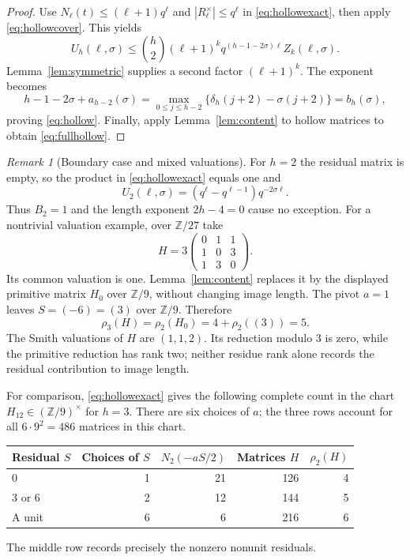 \documentclass[11pt]{article}
\numberwithin{equation}{section}
\theoremstyle{remark}
\newtheorem{remark}[theorem]{Remark}
\newcommand{\Z}{\mathbb Z}
\begin{document}
\begin{proof}
Use $N_\ell(t)\le(\ell+1)q^\ell$ and
$|R_\ell^\times|\le q^\ell$ in \eqref{eq:hollowexact}, then apply
\eqref{eq:hollowcover}. This yields
\begin{equation}\label{eq:hollowpivotbound}
 U_h(\ell,\sigma )\le\binom h2(\ell+1)^k
              q^{(h-1-2\sigma )\ell}Z_k(\ell,\sigma ).
\end{equation}
Lemma~\ref{lem:symmetric} supplies a second factor $(\ell+1)^k$.
The exponent becomes
\[
 h-1-2\sigma +a_{h-2}(\sigma )
 =\max_{0\le j\le h-2}\{\delta_h(j+2)-\sigma (j+2)\}=b_h(\sigma ),
\]
proving \eqref{eq:hollow}. Finally, apply Lemma~\ref{lem:content}
to hollow matrices to obtain \eqref{eq:fullhollow}.
\end{proof}

\begin{remark}[Boundary case and mixed valuations]\label{rem:mixedvaluation}
For $h=2$ the residual matrix is empty, so the product in
\eqref{eq:hollowexact} equals one and
\[
 U_2(\ell,\sigma )=(q^\ell-q^{\ell-1})q^{-2\sigma \ell}.
\]
Thus $B_2=1$ and the length exponent $2h-4=0$ cause no exception.
For a nontrivial valuation example, over $\Z/27$ take
\[
 H=3\begin{pmatrix}0&1&1\\1&0&3\\1&3&0\end{pmatrix}.
\]
Its common valuation is one. Lemma~\ref{lem:content} replaces it by
the displayed primitive matrix $H_0$ over $\Z/9$, without changing
image length. The pivot $a=1$ leaves $S=(-6)=(3)$ over $\Z/9$.
Therefore
\[
 \rho_3(H)=\rho_2(H_0)=4+\rho_2((3))=5.
\]
The Smith valuations of $H$ are $(1,1,2)$. Its reduction modulo $3$
is zero, while the primitive reduction has rank two; neither residue
rank alone records the residual contribution to image length.
\end{remark}

For comparison, \eqref{eq:hollowexact} gives the following complete
count in the chart $H_{12}\in(\Z/9)^\times$ for $h=3$.
There are six choices of $a$; the three rows account for all
$6\cdot9^2=486$ matrices in this chart.
\begin{center}
\begin{tabular}{lrrrr}
\toprule
Residual $S$ & Choices of $S$ & $N_2(-aS/2)$ & Matrices $H$ & $\rho_2(H)$\\
\midrule
$0$ & 1 & 21 & 126 & 4\\
$3$ or $6$ & 2 & 12 & 144 & 5\\
A unit & 6 & 6 & 216 & 6\\
\bottomrule
\end{tabular}
\end{center}
The middle row records precisely the nonzero nonunit residuals.
\end{document}
